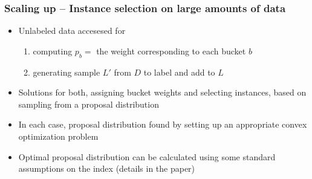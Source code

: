 \documentclass[usenames,dvipsnames, 11pt]{beamer}
\newcommand{\wt}{{p}}
\newlength{\wideitemsep}
\let\olditem\item
\renewcommand{\item}{\setlength{\itemsep}{\wideitemsep}\olditem}
\begin{document}
\begin{frame}
\frametitle{Scaling up -- Instance selection on large amounts of data} 
\begin{itemize}
\pause
\item Unlabeled data accesesed for 
\begin{enumerate}
\item computing $\wt_b=$ the weight corresponding to each bucket $b$ 
\item generating sample $L'$ from $D$ to label and add to $L$
\end{enumerate}
\vspace{1mm}
\pause
\item Solutions for both, assigning bucket weights and selecting instances, based on sampling from a proposal distribution
\vspace{1mm} \pause
\item In each case, proposal distribution found by setting up an appropriate convex optimization problem
\pause
\item Optimal proposal distribution can be calculated using some standard assumptions on the index (details in the paper)
\end{itemize}
\end{frame}

\end{document}
